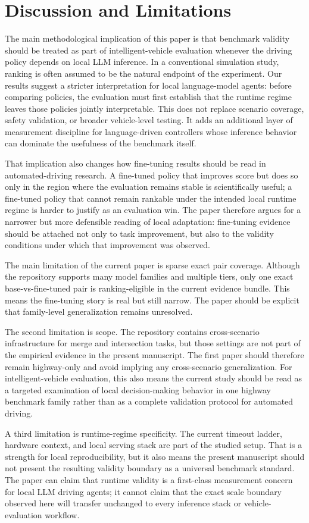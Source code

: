 \section{Discussion and Limitations}

The main methodological implication of this paper is that benchmark validity should be treated as part of intelligent-vehicle evaluation whenever the driving policy depends on local LLM inference. In a conventional simulation study, ranking is often assumed to be the natural endpoint of the experiment. Our results suggest a stricter interpretation for local language-model agents: before comparing policies, the evaluation must first establish that the runtime regime leaves those policies jointly interpretable. This does not replace scenario coverage, safety validation, or broader vehicle-level testing. It adds an additional layer of measurement discipline for language-driven controllers whose inference behavior can dominate the usefulness of the benchmark itself.

That implication also changes how fine-tuning results should be read in automated-driving research. A fine-tuned policy that improves score but does so only in the region where the evaluation remains stable is scientifically useful; a fine-tuned policy that cannot remain rankable under the intended local runtime regime is harder to justify as an evaluation win. The paper therefore argues for a narrower but more defensible reading of local adaptation: fine-tuning evidence should be attached not only to task improvement, but also to the validity conditions under which that improvement was observed.

The main limitation of the current paper is sparse exact pair coverage. Although the repository supports many model families and multiple tiers, only one exact base-vs-fine-tuned pair is ranking-eligible in the current evidence bundle. This means the fine-tuning story is real but still narrow. The paper should be explicit that family-level generalization remains unresolved.

The second limitation is scope. The repository contains cross-scenario infrastructure for merge and intersection tasks, but those settings are not part of the empirical evidence in the present manuscript. The first paper should therefore remain highway-only and avoid implying any cross-scenario generalization. For intelligent-vehicle evaluation, this also means the current study should be read as a targeted examination of local decision-making behavior in one highway benchmark family rather than as a complete validation protocol for automated driving.

A third limitation is runtime-regime specificity. The current timeout ladder, hardware context, and local serving stack are part of the studied setup. That is a strength for local reproducibility, but it also means the present manuscript should not present the resulting validity boundary as a universal benchmark standard. The paper can claim that runtime validity is a first-class measurement concern for local LLM driving agents; it cannot claim that the exact scale boundary observed here will transfer unchanged to every inference stack or vehicle-evaluation workflow.
